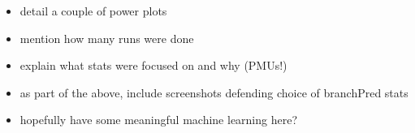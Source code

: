 \begin{itemize}
    \item detail a couple of power plots
    \item mention how many runs were done
    \item explain what stats were focused on and why (PMUs!)
    \item as part of the above, include screenshots defending choice of 
          branchPred stats
    \item hopefully have some meaningful machine learning here?
\end{itemize}